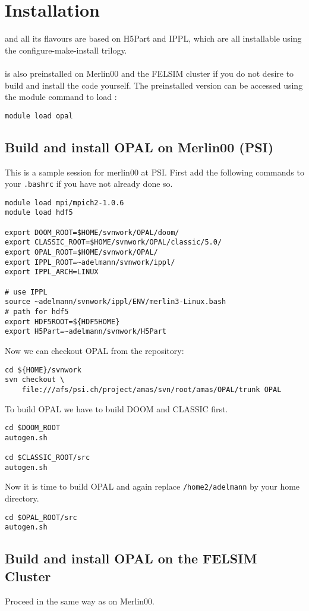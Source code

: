 \chapter{Installation}
\label{sec:installation}
\opal and all its flavours are based on H5Part and IPPL, which are all installable using the configure-make-install trilogy. \\ \\
\opal is also preinstalled on Merlin00 and the FELSIM cluster if you do not desire to build and install the code yourself. The preinstalled version can be accessed 
using the module command to load \opal: 
\begin{verbatim}
module load opal
\end{verbatim}


\section{Build and install OPAL on Merlin00 (PSI)}
This is a sample session for merlin00 at PSI. First add the following commands to your {\tt .bashrc} if
you have not already  done so. 
\begin{verbatim}
module load mpi/mpich2-1.0.6
module load hdf5

export DOOM_ROOT=$HOME/svnwork/OPAL/doom/
export CLASSIC_ROOT=$HOME/svnwork/OPAL/classic/5.0/
export OPAL_ROOT=$HOME/svnwork/OPAL/
export IPPL_ROOT=~adelmann/svnwork/ippl/
export IPPL_ARCH=LINUX

# use IPPL 
source ~adelmann/svnwork/ippl/ENV/merlin3-Linux.bash
# path for hdf5
export HDF5ROOT=${HDF5HOME}
export H5Part=~adelmann/svnwork/H5Part
\end{verbatim}
Now we can checkout OPAL from the repository: 
\begin{verbatim}
cd ${HOME}/svnwork
svn checkout \
    file:///afs/psi.ch/project/amas/svn/root/amas/OPAL/trunk OPAL
\end{verbatim}
To build OPAL we have to build DOOM and CLASSIC first.
\begin{verbatim}
cd $DOOM_ROOT
autogen.sh

cd $CLASSIC_ROOT/src
autogen.sh
\end{verbatim}
Now it is time to build OPAL and again replace {\tt /home2/adelmann} by your home directory.
\begin{verbatim}
cd $OPAL_ROOT/src
autogen.sh
\end{verbatim}

\section{Build and install OPAL on the FELSIM Cluster}
Proceed in the same way as on Merlin00.

